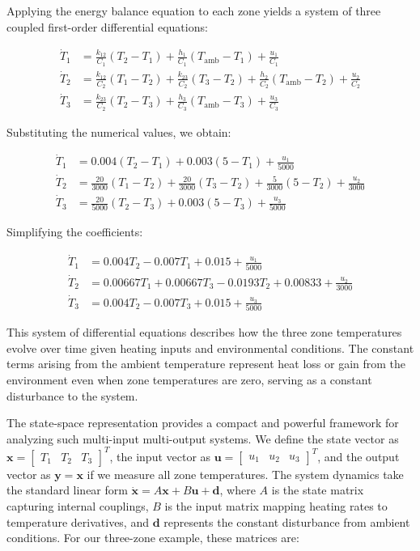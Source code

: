 Applying the energy balance equation to each zone yields a system of three coupled first-order differential equations:

\begin{align}
\dot{T}_1 &= \frac{k_{12}}{C_1}(T_2 - T_1) + \frac{h_1}{C_1}(T_{\text{amb}} - T_1) + \frac{u_1}{C_1} \\
\dot{T}_2 &= \frac{k_{12}}{C_2}(T_1 - T_2) + \frac{k_{23}}{C_2}(T_3 - T_2) + \frac{h_2}{C_2}(T_{\text{amb}} - T_2) + \frac{u_2}{C_2} \\
\dot{T}_3 &= \frac{k_{23}}{C_2}(T_2 - T_3) + \frac{h_3}{C_3}(T_{\text{amb}} - T_3) + \frac{u_3}{C_3}
\end{align}

Substituting the numerical values, we obtain:

\begin{align}
\dot{T}_1 &= 0.004(T_2 - T_1) + 0.003(5 - T_1) + \frac{u_1}{5000} \\
\dot{T}_2 &= \frac{20}{3000}(T_1 - T_2) + \frac{20}{3000}(T_3 - T_2) + \frac{5}{3000}(5 - T_2) + \frac{u_2}{3000} \\
\dot{T}_3 &= \frac{20}{5000}(T_2 - T_3) + 0.003(5 - T_3) + \frac{u_3}{5000}
\end{align}

Simplifying the coefficients:

\begin{align}
\dot{T}_1 &= 0.004T_2 - 0.007T_1 + 0.015 + \frac{u_1}{5000} \\
\dot{T}_2 &= 0.00667T_1 + 0.00667T_3 - 0.0193T_2 + 0.00833 + \frac{u_2}{3000} \\
\dot{T}_3 &= 0.004T_2 - 0.007T_3 + 0.015 + \frac{u_3}{5000}
\end{align}

This system of differential equations describes how the three zone temperatures evolve over time given heating inputs and environmental conditions. The constant terms arising from the ambient temperature represent heat loss or gain from the environment even when zone temperatures are zero, serving as a constant disturbance to the system.

The state-space representation provides a compact and powerful framework for analyzing such multi-input multi-output systems. We define the state vector as $\mathbf{x} = \begin{bmatrix} T_1 & T_2 & T_3 \end{bmatrix}^T$, the input vector as $\mathbf{u} = \begin{bmatrix} u_1 & u_2 & u_3 \end{bmatrix}^T$, and the output vector as $\mathbf{y} = \mathbf{x}$ if we measure all zone temperatures. The system dynamics take the standard linear form $\dot{\mathbf{x}} = A\mathbf{x} + B\mathbf{u} + \mathbf{d}$, where $A$ is the state matrix capturing internal couplings, $B$ is the input matrix mapping heating rates to temperature derivatives, and $\mathbf{d}$ represents the constant disturbance from ambient conditions. For our three-zone example, these matrices are:

